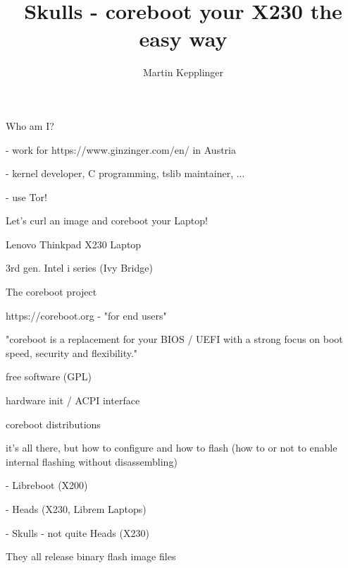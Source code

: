 \documentclass[14pt]{beamer}
\title{Skulls - coreboot your X230 the easy way}
\author{Martin Kepplinger}
\begin{document}
\begin{frame}
\titlepage
\end{frame}


\begin{frame}
Who am I?

- work for https://www.ginzinger.com/en/ in Austria

- kernel developer, C programming, tslib maintainer, ...

- use Tor!
\end{frame}


\begin{frame}
Let's curl an image and coreboot your Laptop!
\end{frame}

\begin{frame}
Lenovo Thinkpad X230 Laptop
\end{frame}


\begin{frame}
3rd gen. Intel i series (Ivy Bridge)


\end{frame}


\begin{frame}
The coreboot project
\end{frame}


\begin{frame}
https://coreboot.org - "for end users"

"coreboot is a replacement for your BIOS / UEFI with a strong focus on boot speed, security and flexibility."

free software (GPL)

hardware init / ACPI interface
\end{frame}

\begin{frame}
coreboot distributions
\end{frame}


\begin{frame}
it's all there, but how to configure and how to flash
(how to or not to enable internal flashing without disassembling)
\pause

- Libreboot (X200)

- Heads (X230, Librem Laptops)

- Skulls - not quite Heads (X230)

They all release binary flash image files
\end{frame}
\end{document}

